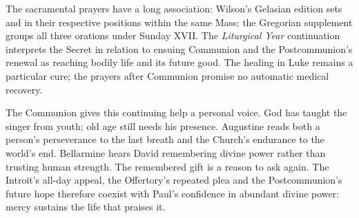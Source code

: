 The sacramental prayers have a long association: Wilson's Gelasian edition sets  and  in their respective positions within the same Mass; the Gregorian supplement groups all three orations under Sunday XVII. The \textit{Liturgical Year} continuation interprets the Secret in relation to ensuing Communion and the Postcommunion's renewal as reaching bodily life and its future good. The healing in Luke remains a particular cure; the prayers after Communion promise no automatic medical recovery. 

The Communion gives this continuing help a personal voice. God has taught the singer from youth; old age still needs his presence. Augustine reads both a person's perseverance to the last breath and the Church's endurance to the world's end. Bellarmine hears David remembering divine power rather than trusting human strength. The remembered gift is a reason to ask again. The Introit's all-day appeal, the Offertory's repeated plea and the Postcommunion's future hope therefore coexist with Paul's confidence in abundant divine power: mercy sustains the life that praises it. 
\clearpage
